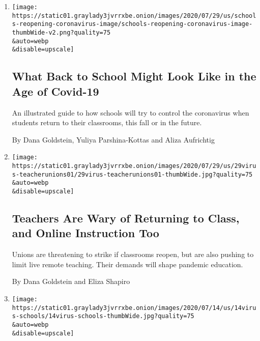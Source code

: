 \begin{enumerate}
\def\labelenumi{\arabic{enumi}.}
\item
  \href{/interactive/2020/07/29/us/schools-reopening-coronavirus.html}{}

  \texttt{[image: https://static01.graylady3jvrrxbe.onion/images/2020/07/29/us/schools-reopening-coronavirus-image/schools-reopening-coronavirus-image-thumbWide-v2.png?quality=75\\\&auto=webp\\\&disable=upscale]}

  \hypertarget{what-back-to-school-might-look-like-in-the-age-of-covid-19}{%
  \subsection{What Back to School Might Look Like in the Age of
  Covid-19}\label{what-back-to-school-might-look-like-in-the-age-of-covid-19}}

  An illustrated guide to how schools will try to control the
  coronavirus when students return to their classrooms, this fall or in
  the future.

  By Dana Goldstein, Yuliya Parshina-Kottas and Aliza Aufrichtig
\item
  \href{/2020/07/29/us/teacher-union-school-reopening-coronavirus.html}{}

  \texttt{[image: https://static01.graylady3jvrrxbe.onion/images/2020/07/29/us/29virus-teacherunions01/29virus-teacherunions01-thumbWide.jpg?quality=75\\\&auto=webp\\\&disable=upscale]}

  \hypertarget{teachers-are-wary-of-returning-to-class-and-online-instruction-too}{%
  \subsection{Teachers Are Wary of Returning to Class, and Online
  Instruction
  Too}\label{teachers-are-wary-of-returning-to-class-and-online-instruction-too}}

  Unions are threatening to strike if classrooms reopen, but are also
  pushing to limit live remote teaching. Their demands will shape
  pandemic education.

  By Dana Goldstein and Eliza Shapiro
\item
  \href{/2020/07/14/us/coronavirus-schools-fall.html}{}

  \texttt{[image: https://static01.graylady3jvrrxbe.onion/images/2020/07/14/us/14virus-schools/14virus-schools-thumbWide.jpg?quality=75\\\&auto=webp\\\&disable=upscale]}

  \hypertarget{most-big-school-districts-arent-ready-to-reopen-heres-why}{%
}
\end{enumerate}

